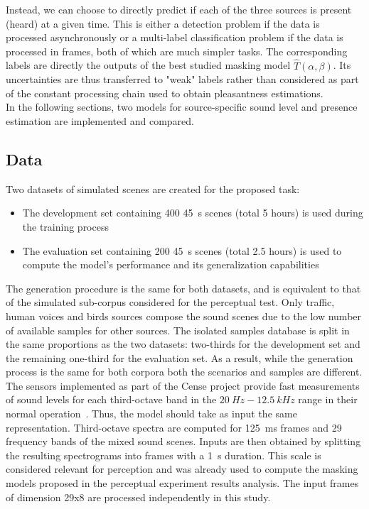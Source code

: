 \documentclass[11pt,a4paper]{article}
\begin{document}
Instead, we can choose to directly predict if each of the three sources is present (heard) at a given time. This is either a detection problem if the data is processed asynchronously or a multi-label classification problem if the data is processed in frames, both of which are much simpler tasks. The corresponding labels are directly the outputs of the best studied masking model $\hat T(\alpha, \beta)$. Its uncertainties are thus transferred to "weak" labels rather than considered as part of the constant processing chain used to obtain pleasantness estimations.\\

In the following sections, two models for source-specific sound level and presence estimation are implemented and compared.

\subsection{Data}
\label{sec:pred_data}

Two datasets of simulated scenes are created for the proposed task:
\begin{itemize}
\item The development set containing 400 45~s scenes (total 5 hours) is used during the training process
\item The evaluation set containing 200 45~s scenes (total 2.5 hours) is used to compute the model's performance and its generalization capabilities
\end{itemize}

The generation procedure is the same for both datasets, and is equivalent to that of the simulated sub-corpus considered for the perceptual test. Only traffic, human voices and birds sources compose the sound scenes due to the low number of available samples for other sources. The isolated samples database is split in the same proportions as the two datasets: two-thirds for the development set and the remaining one-third for the evaluation set. As a result, while the generation process is the same for both corpora both the scenarios and samples are different.\\

The sensors implemented as part of the Cense project provide fast measurements of sound levels for each third-octave band in the $20~Hz - 12.5~kHz$ range in their normal operation~\cite{gontier2017}. Thus, the model should take as input the same representation. Third-octave spectra are computed for 125~ms frames and 29 frequency bands of the mixed sound scenes. Inputs are then obtained by splitting the resulting spectrograms into frames with a 1~s duration. This scale is considered relevant for perception and was already used to compute the masking models proposed in the perceptual experiment results analysis. The input frames of dimension 29x8 are processed independently in this study.\\
\end{document}
